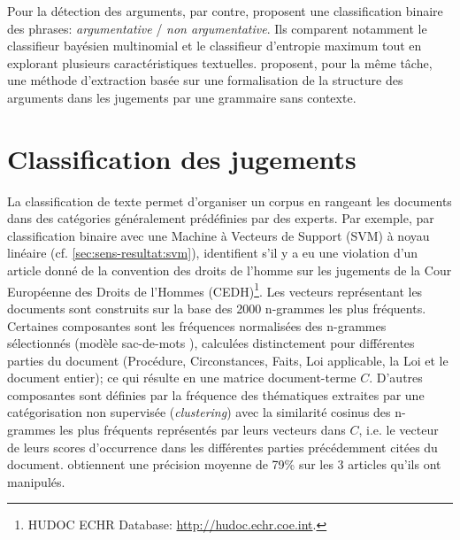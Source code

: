  Pour la détection des arguments, par contre, \citet{moens2007NBvsMaxent4arguments} proposent une classification binaire des phrases: \textit{argumentative} / \textit{non argumentative}. Ils comparent notamment le classifieur bayésien multinomial et le classifieur d'entropie maximum tout en explorant plusieurs caractéristiques textuelles. \citet{mochales2008contextfreegrammararg} proposent, pour la même tâche, une méthode d'extraction basée sur une formalisation de la structure des arguments dans les jugements par une grammaire sans contexte. 


\section{Classification des jugements}
La classification de texte permet d'organiser un corpus en rangeant les documents dans des catégories généralement prédéfinies par des experts. Par exemple, par classification binaire avec une Machine à Vecteurs de Support (SVM) \citep{vapnik1995statlearning} à noyau linéaire (cf. \ref{sec:sens-resultat:svm}),  \citet{Aletras2016predictDecisionECHR} identifient s'il y a eu une violation d'un article donné de la convention des droits de l'homme sur les jugements de la Cour Européenne des Droits de l'Hommes (CEDH)\footnote{HUDOC ECHR Database: \url{http://hudoc.echr.coe.int}.}. Les vecteurs représentant les documents sont construits sur la base des 2000 n-grammes les plus fréquents. Certaines composantes  sont les fréquences normalisées des n-grammes sélectionnés (modèle sac-de-mots \citep{salton1975BoW, salton1983modernIR_BoW}), calculées distinctement pour différentes parties du document (Procédure, Circonstances, Faits, Loi applicable, la Loi et le document entier); ce qui résulte en une matrice document-terme $C$. D'autres composantes sont définies par la fréquence des thématiques extraites par une catégorisation non supervisée (\textit{clustering}) avec la similarité cosinus des n-grammes les plus fréquents représentés par leurs vecteurs dans $C$, i.e. le vecteur de leurs scores d'occurrence dans les différentes parties précédemment citées du document. \citet{Aletras2016predictDecisionECHR} obtiennent une précision moyenne de 79\% sur les 3 articles qu'ils ont manipulés. 
